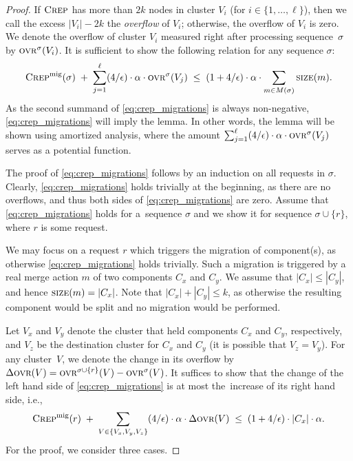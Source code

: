 \documentclass{siamart190516}
\newcommand{\CREP}{\textsc{Crep}\xspace}
\newcommand{\CREPmig}{\CREP^\textnormal{mig}}
\newcommand{\ovr}{\textsc{ovr}}
\newcommand{\eps}{\ensuremath{\epsilon}}
\newcommand{\size}{\textsc{size}}
\begin{document}
\begin{proof}
If $\CREP$ has more than $2 k$ nodes in cluster $V_i$ (for $i \in
\{1,\ldots,\ell\}$), then we call the excess $|V_i| - 2 k$ the \emph{overflow} of $V_i$;
otherwise, the overflow of $V_i$ is zero. We denote the overflow of cluster
$V_i$ measured right after processing sequence~$\sigma$ by $\ovr^\sigma(V_i)$.
It is sufficient to show the following relation for any sequence $\sigma$:
\begin{equation}
\label{eq:crep_migrations}
 \CREPmig(\sigma) \;+\; \sum_{j=1}^\ell (4/\eps) \cdot \alpha \cdot \ovr^\sigma(V_j) 
 \; \leq \; (1+4/\eps)  \cdot \alpha \cdot \sum_{m \in M(\sigma)} \size(m).
\end{equation}
As the second summand of \eqref{eq:crep_migrations} is always non-negative,
\eqref{eq:crep_migrations} will imply the lemma. 
In other words, the lemma will be shown using amortized analysis, where
the amount $\sum_{j=1}^\ell (4/\eps) \cdot \alpha \cdot \ovr^\sigma(V_j)$ serves 
as a potential function.

The proof of \eqref{eq:crep_migrations} follows by an induction on all
requests in $\sigma$. Clearly, \eqref{eq:crep_migrations} holds trivially at the
beginning, as there are no overflows, and thus both sides of
\eqref{eq:crep_migrations} are zero. Assume that \eqref{eq:crep_migrations}
holds for a~sequence $\sigma$ and we show it for sequence $\sigma \cup \{ r \}$,
where $r$ is some request.

We may focus on a request $r$ which triggers the migration of
component(s), as otherwise
\eqref{eq:crep_migrations} holds trivially. Such a migration is triggered by a
real merge action $m$ of two components $C_x$ and $C_y$. We assume that $|C_x|
\leq |C_y|$, and hence $\size(m) = |C_x|$. Note that $|C_x| + |C_y| \leq k$,
as otherwise the resulting component would be split and no migration would
be performed.

Let $V_x$ and $V_y$ denote the cluster that held components $C_x$ and $C_y$,
respectively, and $V_z$ be the destination cluster for $C_x$ and $C_y$ (it is
possible that $V_z = V_y$). For any cluster~$V$, we denote the change in 
its overflow by $\Delta \ovr(V) = \ovr^{\sigma \cup \{r\}}(V) - \ovr^\sigma(V)$. 
It suffices to show that the
change of the left hand side of \eqref{eq:crep_migrations} is at most
the~increase of its right hand side, i.e.,
\begin{equation}
\label{eq:crep_mig_inc}
\CREPmig(r) \;+\; \sum_{V \in \{ V_x, V_y, V_z \}} (4/\eps) \cdot \alpha \cdot \Delta\ovr(V) 
\;\leq\; (1+4/\eps) \cdot |C_x| \cdot \alpha.
\end{equation}
For the proof, we consider three cases.


\end{proof}
\end{document}
